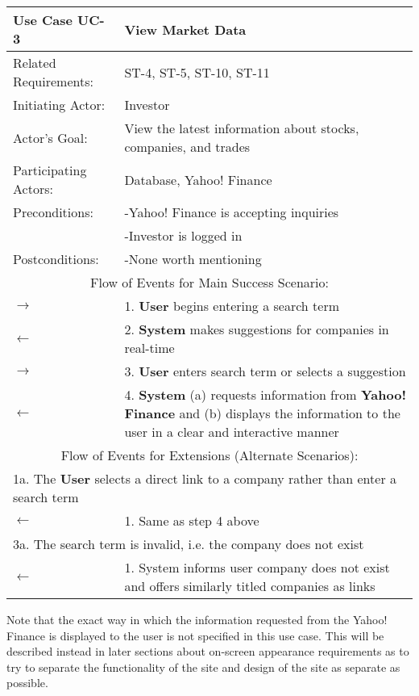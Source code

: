 \begin{centering}
\renewcommand\arraystretch{1.3}
\label{UC-3}
\begin{longtable}{|p{1.2in} p{5in}|}
\hline
\bfseries{\color{color1}Use Case UC-3} &
\bfseries{\color{color1}View Market Data} \\
\hline
Related Requirements: & ST-4, ST-5, ST-10, ST-11 \\
Initiating Actor:     & Investor \\
Actor's Goal:         & View the latest information about stocks, companies, and trades\\
Participating Actors: & Database, Yahoo! Finance \\
Preconditions:        & -Yahoo! Finance is accepting inquiries \\
                      & -Investor is logged in \\
Postconditions:       & -None worth mentioning \\
\hline
\multicolumn{2}{|c|}{\color{color1}Flow of Events for Main Success Scenario:}\\
\hline
$\rightarrow$ & 1. \textbf{User} begins entering a search term \\
$\leftarrow$ & 2. \textbf{System} makes suggestions for companies in real-time \\
$\rightarrow$ & 3. \textbf{User} enters search term or selects a suggestion \\
$\leftarrow$ & 4. \textbf{System} (a) requests information from \textbf{Yahoo! Finance} and (b) displays the information to the user in a clear and interactive manner \\
\hline
\multicolumn{2}{|c|}{\color{color1}Flow of Events for Extensions (Alternate Scenarios):} \\
\hline
\multicolumn{2}{|p{6.2in}|}{1a. The \textbf{User} selects a direct link to a company rather than enter a search term} \\
\hline
$\leftarrow$ & 1.  Same as step 4 above \\
\hline 
\multicolumn{2}{|p{6.2in}|}{3a. The search term is invalid, i.e. the company does not exist} \\
\hline
$\leftarrow$ & 1.  System informs user company does not exist and offers similarly titled companies as links \\
\hline
\end{longtable}
\end{centering}

Note that the exact way in which the information requested from the Yahoo! Finance is
displayed to the user is not specified in this use case. This will be described instead
in later sections about on-screen appearance requirements as to try to separate the
functionality of the site and design of the site as separate as possible. \\


